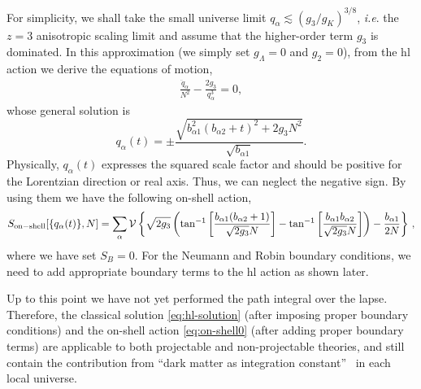 \documentclass[superscriptaddress,aps,preprintnumbers,nofootinbib]{revtex4-2}
\begin{document}
For simplicity, we shall take the small universe limit $q_{\alpha}\lesssim (g_3/g_K)^{3/8}$, \textit{i.e}. the $z=3$ anisotropic scaling limit and assume that the higher-order term $g_{3}$ is dominated. In this approximation (we simply set $g_{\Lambda}=0$ and $g_2=0$), from the \ac{hl} action we derive the equations of motion,
\begin{align}
\frac{\ddot{q}_{\alpha}}{N^2}-\frac{2g_3}{q^{3}_{\alpha}}=0,
\end{align}
whose general solution is 
\begin{equation}\label{eq:hl-solution}
q_{\alpha}(t)=\pm \frac{\sqrt{b_{\alpha 1}^2
(b_{\alpha 2}+t)^2+2g_3N^2}}{\sqrt{b_{\alpha 1}}}.    
\end{equation}
Physically, $q_{\alpha}(t)$ expresses the squared scale factor and should be positive for the Lorentzian direction or real axis. Thus, we can neglect the negative sign. By using them we have the following on-shell action, 
\begin{equation}\label{eq:on-shell0}
S_{\rm on-shell}[\{q_{\alpha}(t)\}, N]
=\sum_{\alpha}{\cal V} \left\{
\sqrt{2g_{3}} \left(\tan ^{-1}\left[\frac{b_{\alpha 1} (b_{\alpha 2}+1)}{\sqrt{2g_{3}} N}\right]-\tan ^{-1}\left[\frac{b_{\alpha 1}b_{\alpha 2}}{\sqrt{2g_{3}} N}\right]\right)-\frac{b_{\alpha 1}}{2 N}\right\}\,,
\end{equation}
where we have set $S_B=0$. For the Neumann and Robin boundary conditions, we need to add appropriate boundary terms to the \ac{hl} action as shown later. 


Up to this point we have not yet performed the path integral over the lapse. Therefore, the classical solution \eqref{eq:hl-solution} (after imposing proper boundary conditions) and the on-shell action \eqref{eq:on-shell0} (after adding proper boundary terms) are applicable to both projectable and non-projectable theories, and still contain the contribution from ``dark matter as integration constant''~\cite{Mukohyama:2009mz,Mukohyama:2009tp} in each local universe. 
\end{document}
